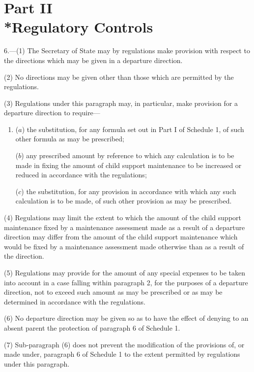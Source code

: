 \documentclass[12pt,a4paper]{article}
\begin{document}
\section[Part II --- Regulatory Controls]{Part II\\*Regulatory Controls}

\renewcommand\parthead{--- Schedule 4B Part II}

6.---(1) The Secretary of State may by regulations make provision with respect to the directions which may be given in a departure direction.

(2) No directions may be given other than those which are permitted by the regulations.

(3) Regulations under this paragraph may, in particular, make provision for a departure direction to require—
\begin{enumerate}\item[]
($a$) the substitution, for any formula set out in Part I of Schedule 1, of such other formula as may be prescribed;

($b$) any prescribed amount by reference to which any calculation is to be made in fixing the amount of child support maintenance to be increased or reduced in accordance with the regulations;

($c$) the substitution, for any provision in accordance with which any such calculation is to be made, of such other provision as may be prescribed.
\end{enumerate}

(4) Regulations may limit the extent to which the amount of the child support maintenance fixed by a maintenance assessment made as a result of a departure direction may differ from the amount of the child support maintenance which would be fixed by a maintenance assessment made otherwise than as a result of the direction.

(5) Regulations may provide for the amount of any special expenses to be taken into account in a case falling within paragraph 2, for the purposes of a departure direction, not to exceed such amount as may be prescribed or as may be determined in accordance with the regulations.

(6) No departure direction may be given so as to have the effect of denying to an absent parent the protection of paragraph 6 of Schedule 1.

(7) Sub-paragraph (6) does not prevent the modification of the provisions of, or made under, paragraph 6 of Schedule 1 to the extent permitted by regulations under this paragraph.
\end{document}
